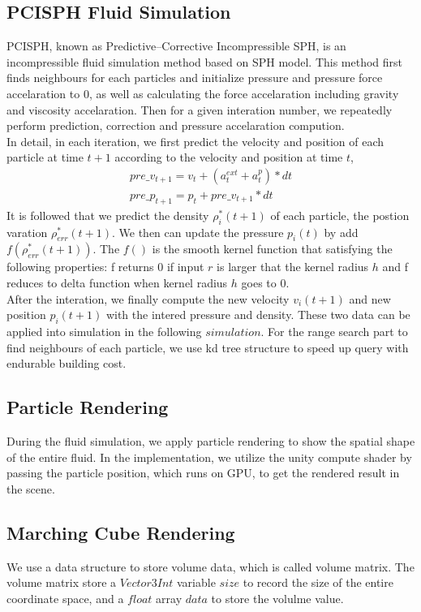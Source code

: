 \documentclass[acmtog]{acmart}
\begin{document}
\subsection{PCISPH Fluid Simulation}
PCISPH, known as Predictive–Corrective Incompressible SPH, is an incompressible fluid simulation method based on SPH model. 
This method first finds neighbours for each particles and initialize pressure and pressure force accelaration to 0, as well as calculating the force accelaration including gravity and viscosity accelaration.
Then for a given interation number, we repeatedly perform prediction, correction and pressure accelaration compution. \\
In detail, in each iteration, we first predict the velocity and position of each particle at time $t+1$ according to the velocity and position at time $t$,
\begin{gather*}
    pre\_v_{t+1} = v_t + (a^{ext}_t + a^{p}_t) * dt \\
    pre\_p_{t+1} = p_t + pre\_v_{t+1} * dt
\end{gather*}
It is followed that we predict the density $\rho _i^*(t+1)$ of each particle, the postion varation $\rho_{err}^*(t+1)$. 
We then can update the pressure $p_i(t)$ by add $f(\rho_{err}^*(t+1))$. The $f()$ is the smooth kernel function that satisfying the following properties:
f returns 0 if input $r$ is larger that the kernel radius $h$ and f reduces to delta function when kernel radius $h$ goes to 0.\\
After the interation, we finally compute the new velocity $v_i(t+1)$ and new position $p_i(t+1)$ with the intered pressure and density. 
These two data can be applied into simulation in the following $simulation$.
For the range search part to find neighbours of each particle, we use kd tree structure to speed up query with endurable building cost.

\subsection{Particle Rendering}
During the fluid simulation, we apply particle rendering to show the spatial shape of the entire fluid.
In the implementation, we utilize the unity compute shader by passing the particle position, which runs on GPU, 
to get the rendered result in the scene.

\subsection{Marching Cube Rendering}
We use a data structure to store volume data, which is called volume matrix. 
The volume matrix store a $Vector3Int$ variable $size$ to record the size of the entire coordinate space, and a $float$ array $data$ to store the volulme value.\\
\end{document}
